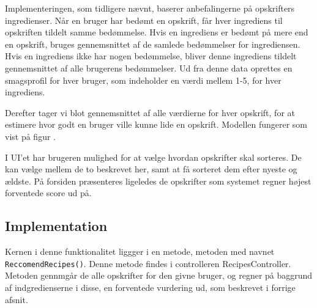 Implementeringen, som tidligere nævnt, baserer anbefalingerne på opskrifters ingredienser.
Når en bruger har bedømt en opskrift, får hver ingrediens til opskriften tildelt samme bedømmelse.
Hvis en ingrediens er bedømt på mere end en opskrift, bruges gennemsnittet af de samlede bedømmelser for ingrediensen.
Hvis en ingrediens ikke har nogen bedømmelse, bliver denne ingrediens tildelt gennemsnittet af alle brugerens bedømmelser.
Ud fra denne data oprettes en smagsprofil for hver bruger, som indeholder en værdi mellem 1-5, for hver ingrediens.

Derefter tager vi blot gennemsnittet af alle værdierne for hver opskrift, for at estimere hvor godt en bruger ville kunne lide en opskrift.
Modellen fungerer som vist på figur .


I UI’et har brugeren mulighed for at vælge hvordan opskrifter skal sorteres.
De kan vælge mellem de to beskrevet her, samt at få sorteret dem efter nyeste og ældste.
På forsiden præsenteres ligeledes de opskrifter som systemet regner højest forventede score ud på.

\subsection{Implementation}
Kernen i denne funktionalitet liggger i en metode, metoden med navnet \texttt{ReccomendRecipes()}.
Denne metode findes i controlleren RecipesController.
Metoden gennmgår de alle opskrifter for den givne bruger, og regner på baggrund af  indgredienserne i disse, en forventede vurdering ud, som beskrevet i forrige afsnit.

